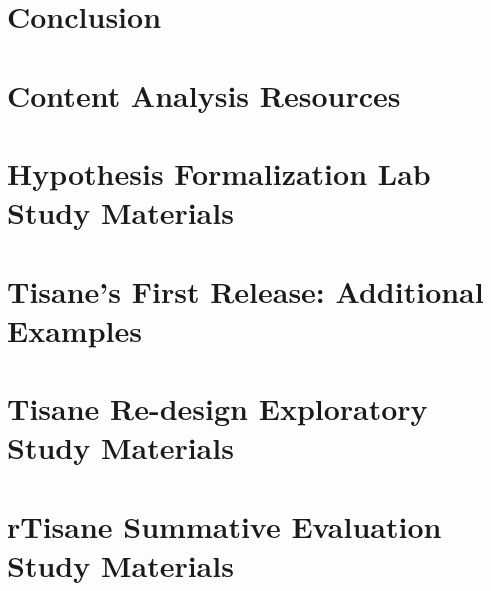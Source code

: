 \documentclass[11pt]{book}
\begin{document}
\chapter{Conclusion}
\label{chapter:conclusion}


\clearpage
{}
\singlespacing



\newpage
\newcommand{\beginsupplement}{%
    \setcounter{chapter}{0}
    \renewcommand{\thechapter}{\Alph{chapter}}%
 }

\appendix
\beginsupplement
\chapter{Content Analysis Resources}
\label{chapter:appHypoForm}


\chapter{Hypothesis Formalization Lab Study Materials}
\label{chapter:appHypoFormLabStudy}


\chapter{Tisane's First Release: Additional Examples}
\label{chapter:appTisane}


\chapter{Tisane Re-design Exploratory Study Materials}
\label{chapter:appTisaneRedesign}


\chapter{rTisane Summative Evaluation Study Materials}
\label{chapter:apprTisane} %

\end{document}
